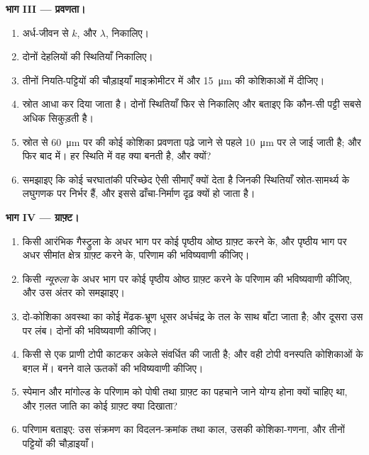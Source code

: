 \begin{problem}
\medskip
\noindent\textbf{भाग III --- प्रवणता।}
\begin{enumerate}[resume]
  \item अर्ध-जीवन से $k$, और $\lambda$, निकालिए।
  \item दोनों देहलियों की स्थितियाँ निकालिए।
  \item तीनों नियति-पट्टियों की चौड़ाइयाँ माइक्रोमीटर में और
        \qty{15}{\micro m} की कोशिकाओं में दीजिए।
  \item स्रोत आधा कर दिया जाता है। दोनों स्थितियाँ फिर से निकालिए और
        बताइए कि कौन-सी पट्टी सबसे अधिक सिकुड़ती है।
  \item स्रोत से \qty{60}{\micro m} पर की कोई कोशिका प्रवणता पढ़े जाने
        से पहले \qty{10}{\micro m} पर ले जाई जाती है; और फिर बाद में।
        हर स्थिति में वह क्या बनती है, और क्यों?
  \item समझाइए कि कोई चरघातांकी परिच्छेद ऐसी सीमाएँ क्यों देता है
        जिनकी स्थितियाँ स्रोत-सामर्थ्य के लघुगणक पर निर्भर हैं,
        और इससे ढाँचा-निर्माण दृढ़ क्यों हो जाता है।
\end{enumerate}

\medskip
\noindent\textbf{भाग IV --- ग्राफ़्ट।}
\begin{enumerate}[resume]
  \item किसी आरंभिक गैस्ट्रुला के अधर भाग पर कोई पृष्ठीय ओष्ठ
        ग्राफ़्ट करने के, और पृष्ठीय भाग पर अधर सीमांत क्षेत्र
        ग्राफ़्ट करने के, परिणाम की भविष्यवाणी कीजिए।
  \item किसी \emph{न्यूरुला} के अधर भाग पर कोई पृष्ठीय ओष्ठ
        ग्राफ़्ट करने के परिणाम की भविष्यवाणी कीजिए, और उस अंतर को समझाइए।
  \item दो-कोशिका अवस्था का कोई मेंढक-भ्रूण धूसर अर्धचंद्र के तल के
        साथ बाँटा जाता है; और दूसरा उस पर लंब। दोनों की भविष्यवाणी कीजिए।
  \item किसी  से एक प्राणी टोपी काटकर अकेले संवर्धित की जाती है;
        और वही टोपी वनस्पति कोशिकाओं के बग़ल में। बनने वाले
        ऊतकों की भविष्यवाणी कीजिए।
  \item स्पेमान और मांगोल्ड के परिणाम को पोषी तथा ग्राफ़्ट का
        पहचाने जाने योग्य होना क्यों चाहिए था, और ग़लत जाति का कोई
        ग्राफ़्ट क्या दिखाता?
  \item परिणाम बताइए: उस संक्रमण का विदलन-क्रमांक तथा काल,
        उसकी कोशिका-गणना, और तीनों पट्टियों की चौड़ाइयाँ।
\end{enumerate}
\end{problem}
